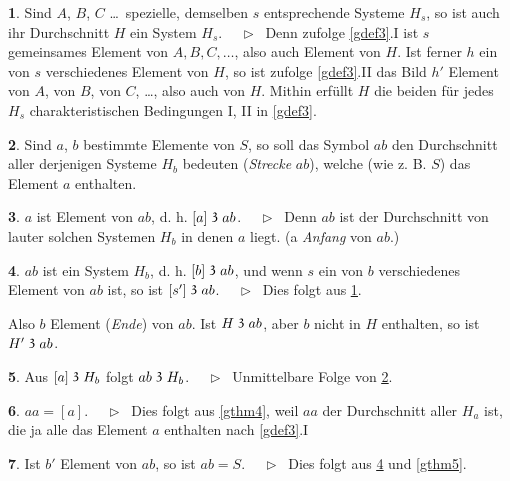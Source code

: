 \documentclass[leqno,hidelinks]{article}
\theoremstyle{definition}
\newtheorem{satz}{\protect\satzname}
\newtheorem{deff}[satz]{\protect\deffname}
\newcommand{\satzname}{}
\newcommand{\deffname}{}
\renewcommand{\satzname}{\hspace{-4pt}.\ Satz}%
\renewcommand{\deffname}{\hspace{-4pt}.\ Definition}%
\renewcommand{\satzname}{\hspace{-4pt}.\ Theorem}%
\renewcommand{\deffname}{\hspace{-4pt}.\ Definition}%
\newcommand\Beweis{\medskip \newline $ \phantom{'.'} \rhd \ $}%
\newcommand\TeilVon{\mathrel{\raisebox{0.45ex}{$\mathfrak{3}$}}}
\newcommand{\sref}[1]{\underline{\ref{#1}}}%
\begin{document}
\begin{paracol}{2}
\begin{satz}\label{gthm8}
Sind $A$, $B$, $C$ \ldots\ spezielle, demselben $s$ entsprechende Systeme $H_s$,
so ist auch ihr Durchschnitt $H$ ein System $H_s$.
\Beweis
Denn zufolge \sref{gdef3}{\color{ultrav}.I} ist $s$ gemeinsames Element von $A, B, C, \ldots$,
also auch Element von $H$. Ist ferner $h$ ein von $s$ verschiedenes Element von
$H$, so ist zufolge \sref{gdef3}{\color{ultrav}.II} das Bild $h'$ Element von $A$, von $B$, von
$C$, \ldots, also auch von $H$. Mithin erfüllt $H$ die beiden für jedes $H_s$
charakteristischen Bedingungen I, II in \sref{gdef3}.
\end{satz}

\begin{deff}\label{gdef9}
Sind $a$, $b$ bestimmte Elemente von $S$, so soll das Symbol $ab$ den Durchschnitt
aller derjenigen Systeme $H_b$ bedeuten (\emph{Strecke} $ab$), welche (wie z. B. $S$)
das Element $a$ enthalten.
\end{deff}

\newpage

\begin{satz}\label{gthm10}
$a$ ist Element von $ab$, d. h. $[a] \TeilVon ab$.
\Beweis
Denn $ab$ ist der Durchschnitt von lauter solchen Systemen $H_b$ in denen $a$
liegt. (a \emph{Anfang} von $ab$.)
\end{satz}

\begin{satz}\label{gthm11}
$ab$ ist ein System $H_b$, d. h. $[b] \TeilVon ab$, und wenn $s$ ein von $b$
verschiedenes Element von $ab$ ist, so ist $[s'] \TeilVon ab$.
\Beweis
Dies folgt aus \sref{gthm8}.
\end{satz}

Also $b$ Element (\emph{Ende}) von $ab$. Ist $H \TeilVon ab$, aber $b$ nicht in
$H$ enthalten, so ist $H' \TeilVon ab$.

\begin{satz}\label{gthm12}
Aus $[a] \TeilVon H_b$ folgt $ab \TeilVon H_b$.
\Beweis
Unmittelbare Folge von \sref{gdef9}.
\end{satz}

\begin{satz}\label{gthm13}
$aa = [a]$.
\Beweis
Dies folgt aus \sref{gthm4}, weil $aa$ der Durchschnitt aller $H_a$  ist, die
ja alle das Element $a$ enthalten nach \sref{gdef3}.I
\end{satz}

\begin{satz}\label{gthm14}
Ist $b'$ Element von $ab$, so ist $ab = S$.
\Beweis
Dies folgt aus \sref{gthm11} und \sref{gthm5}.
\end{satz}


\end{paracol}
\end{document}
